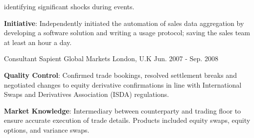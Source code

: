 \begin{cventries}
{\begin{cvitems}
{        identifying significant shocks during events}.
        \item {\textbf{Initiative}: Independently initiated the automation of sales data aggregation by developing a software solution and writing a usage protocol; saving the sales team at least an hour a 
        day}.
      \end{cvitems} 
    }
  \cventry
    {Consultant}
    {Sapient Global Markets}
    {London, U.K}
    {Jun. 2007 - Sep. 2008}
    {
      \begin{cvitems}
        \item {\textbf{Quality Control}: Confirmed trade bookings, resolved settlement breaks and negotiated 
        changes to equity derivative confirmations in line with International Swaps and Derivatives Association 
        (ISDA) regulations}.
        \item {\textbf{Market Knowledge}: Intermediary between counterparty and trading floor to ensure accurate execution of trade details. Products included equity swaps, equity options, and variance swaps}.
      \end{cvitems}
    }
\end{cventries}
